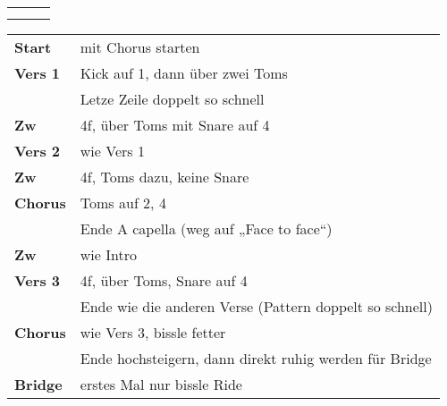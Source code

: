 

\begin{tabular}{p{0.6cm}p{12cm}p{1.4cm}}
	\rowcolor{cyan} \myRow{\thesongnumber} & \myRow{Every Step} & \myRow{104} \\
	                                       &                    &             \\
\end{tabular}

\begin{tabular}{p{1.6cm}l}
	\textbf{Start}  & mit Chorus starten                                                       \\
	\textbf{Vers 1} & Kick auf 1, dann über zwei Toms                                          \\
	                & Letze Zeile doppelt so schnell                                           \\
	\textbf{Zw}     & 4f, über Toms mit Snare auf 4                                            \\
	\textbf{Vers 2} & wie Vers 1                                                               \\
	\textbf{Zw}     & 4f, Toms dazu, keine Snare                                               \\
	\textbf{Chorus} & Toms auf 2, 4                                                            \\
	                & Ende A capella (weg auf „Face to face“)                                  \\
	\textbf{Zw}     & wie Intro                                                                \\
	\textbf{Vers 3} & 4f, über Toms, Snare auf 4                                               \\
	                & Ende wie die anderen Verse (Pattern doppelt so schnell)                  \\
	\textbf{Chorus} & wie Vers 3, bissle fetter                                                \\
	                & Ende hochsteigern, dann direkt ruhig werden für Bridge                   \\
	\textbf{Bridge} & erstes Mal nur bissle Ride                                               \\

\end{tabular}
